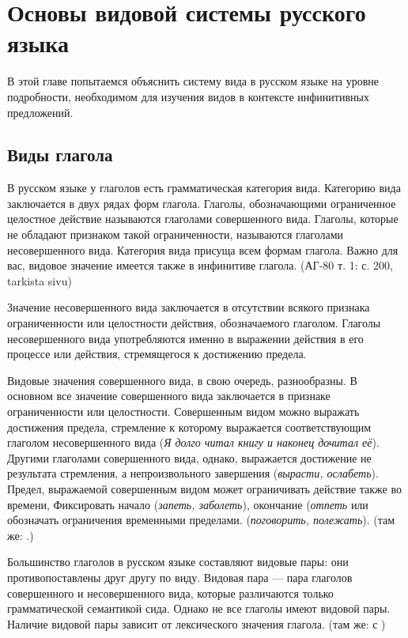 \section{Основы видовой системы русского языка}

В этой главе попытаемся объяснить систему вида в русском языке на уровне подробности, необходимом для изучения видов в контексте инфинитивных предложений.

\subsection{Виды глагола}

В русском языке у глаголов есть грамматическая категория вида. Категорию вида заключается в двух рядах форм глагола. Глаголы, обозначающими ограниченное целостное действие называются глаголами совершенного вида. Глаголы, которые не обладают признаком такой ограниченности, называются глаголами несовершенного вида. Категория вида присуща всем формам глагола. Важно для вас, видовое значение имеется также в инфинитиве глагола. (АГ-80 т. 1: с. 200, tarkista sivu)

Значение несовершенного вида заключается в отсутствии всякого признака ограниченности или целостности действия, обозначаемого глаголом. Глаголы несовершенного вида употребляются именно в выражении действия в его процессе или действия, стремящегося к достижению предела.

Видовые значения совершенного вида, в свою очередь, разнообразны. В основном все значение совершенного вида заключается в признаке ограниченности или целостности. Совершенным видом можно выражать достижения предела, стремление к которому выражается соответствующим глаголом несовершенного вида (\textit{Я долго читал книгу и наконец дочитал её}). Другими глаголами совершенного вида, однако, выражается достижение не результата стремления, а непроизвольного завершения (\textit{вырасти, ослабеть}). Предел, выражаемой совершенным видом может ограничивать действие также во времени, Фиксировать начало (\textit{запеть, заболеть}), окончание (\textit{отпеть} или обозначать ограничения временными пределами. (\textit{поговорить, полежать}). (там же: .) 

Большинство глаголов в русском языке составляют видовые пары: они противопоставлены друг другу по виду. Видовая пара --- пара глаголов совершенного и несовершенного вида, которые различаются только грамматической семантикой сида. Однако не все глаголы имеют видовой пары. Наличие видовой пары зависит от лексического значения глагола. (там же: с )

